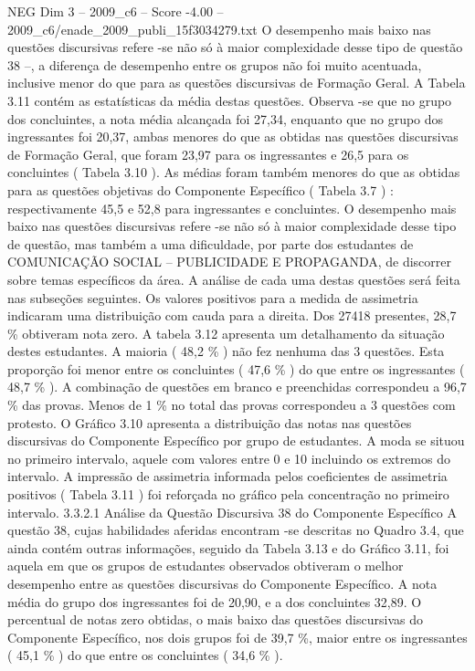 \begin{textsample}{NEG Dim 3 – 2009\_c6 – Score -4.00 – 2009\_c6/enade\_2009\_publi\_15f3034279.txt}
O desempenho mais baixo nas questões discursivas refere -se não só à maior complexidade desse tipo de questão 38 –, a diferença de desempenho entre os grupos não foi muito acentuada, inclusive menor do que para as questões discursivas de Formação Geral.
A Tabela 3.11 contém as estatísticas da média destas questões.
Observa -se que no grupo dos concluintes, a nota média alcançada foi 27,34, enquanto que no grupo dos ingressantes foi 20,37, ambas menores do que as obtidas nas questões discursivas de Formação Geral, que foram 23,97 para os ingressantes e 26,5 para os concluintes ( Tabela 3.10 ).
As médias foram também menores do que as obtidas para as questões objetivas do Componente Específico ( Tabela 3.7 ) : respectivamente 45,5 e 52,8 para ingressantes e concluintes.
O desempenho mais baixo nas questões discursivas refere -se não só à maior complexidade desse tipo de questão, mas também a uma dificuldade, por parte dos estudantes de COMUNICAÇÃO SOCIAL – PUBLICIDADE E PROPAGANDA, de discorrer sobre temas específicos da área.
A análise de cada uma destas questões será feita nas subseções seguintes.
Os valores positivos para a medida de assimetria indicaram uma distribuição com cauda para a direita.
Dos 27418 presentes, 28,7 \% obtiveram nota zero.
A tabela 3.12 apresenta um detalhamento da situação destes estudantes.
A maioria ( 48,2 \% ) não fez nenhuma das 3 questões.
Esta proporção foi menor entre os concluintes ( 47,6 \% ) do que entre os ingressantes ( 48,7 \% ).
A combinação de questões em branco e preenchidas correspondeu a 96,7 \% das provas.
Menos de 1 \% no total das provas correspondeu a 3 questões com protesto.
O Gráfico 3.10 apresenta a distribuição das notas nas questões discursivas do Componente Específico por grupo de estudantes.
A moda se situou no primeiro intervalo, aquele com valores entre 0 e 10 incluindo os extremos do intervalo.
A impressão de assimetria informada pelos coeficientes de assimetria positivos ( Tabela 3.11 ) foi reforçada no gráfico pela concentração no primeiro intervalo. 3.3.2.1 Análise da Questão Discursiva 38 do Componente Específico A questão 38, cujas habilidades aferidas encontram -se descritas no Quadro 3.4, que ainda contém outras informações, seguido da Tabela 3.13 e do Gráfico 3.11, foi aquela em que os grupos de estudantes observados obtiveram o melhor desempenho entre as questões discursivas do Componente Específico.
A nota média do grupo dos ingressantes foi de 20,90, e a dos concluintes 32,89.
O percentual de notas zero obtidas, o mais baixo das questões discursivas do Componente Específico, nos dois grupos foi de 39,7 \%, maior entre os ingressantes ( 45,1 \% ) do que entre os concluintes ( 34,6 \% ).

\end{textsample}
